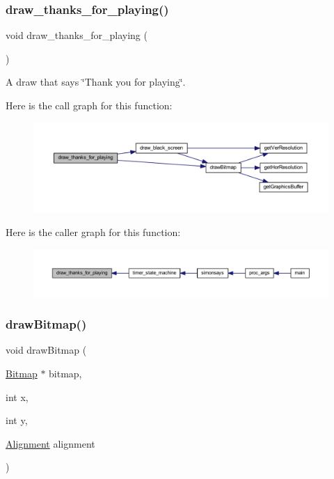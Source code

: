 \subsubsection{\texorpdfstring{draw\+\_\+thanks\+\_\+for\+\_\+playing()}{draw\_thanks\_for\_playing()}}
{\footnotesize\ttfamily void draw\+\_\+thanks\+\_\+for\+\_\+playing (\begin{DoxyParamCaption}{ }\end{DoxyParamCaption})}



A draw that says \char`\"{}\+Thank you for playing\char`\"{}. 

Here is the call graph for this function\+:\nopagebreak
\begin{figure}[H]
\begin{center}
\leavevmode
\includegraphics[width=350pt]{group___bitmap_gabbf5153c909fc82e7734744352e22de9_cgraph}
\end{center}
\end{figure}
Here is the caller graph for this function\+:\nopagebreak
\begin{figure}[H]
\begin{center}
\leavevmode
\includegraphics[width=350pt]{group___bitmap_gabbf5153c909fc82e7734744352e22de9_icgraph}
\end{center}
\end{figure}
\mbox{\label{group___bitmap_ga18d05a1c671f4638bc63d37874efb9d4}} 
\subsubsection{\texorpdfstring{draw\+Bitmap()}{drawBitmap()}}
{\footnotesize\ttfamily void draw\+Bitmap (\begin{DoxyParamCaption}\item[{\hyperlink{struct_bitmap}{Bitmap} $\ast$}]{bitmap,  }\item[{int}]{x,  }\item[{int}]{y,  }\item[{\hyperlink{group___bitmap_gacdfaca60ec19c0265bac2692d7982726}{Alignment}}]{alignment }\end{DoxyParamCaption})}



